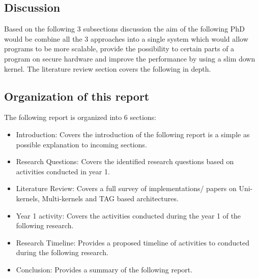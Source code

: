 \subsection{Discussion}
Based on the following 3 subsections discussion the aim of the 
following PhD would be combine all the 3 approaches into a 
single system which would allow programs to be more scalable, 
provide the possibility to certain parts of a program on secure 
hardware and improve the performance by using a slim down kernel. 
The literature review section covers the following in depth. 

\subsection{Organization of this report}
The following report is organized into 6 sections:
\begin{itemize}
    \item Introduction: Covers the introduction of the following report 
    is a simple as possible explanation to incoming sections.
    \item Research Questions: Covers the identified research questions 
    based on activities conducted in year 1.
    \item Literature Review: Covers a full survey of implementations/ papers 
    on Uni-kernels, Multi-kernels and TAG based architectures.
    \item Year 1 activity: Covers the activities conducted during the year 1 
    of the following research.
    \item Research Timeline: Provides a proposed timeline of activities to conducted 
    during the following research.
    \item Conclusion: Provides a summary of the following report.
\end{itemize}


